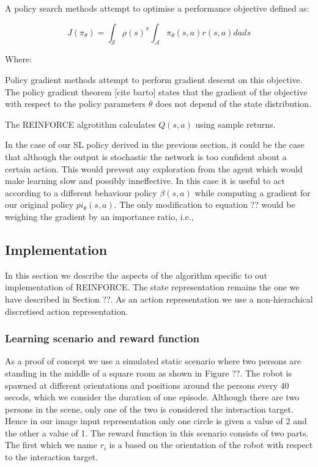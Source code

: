 \documentclass[a4paper,11pt]{report}
\begin{document}
A policy search methods attempt to optimise a performance objective defined as:

\begin{equation}
	J(\pi_{\theta}) = \int_{\mathcal{S}} \rho(s)^{\pi} \int_{\mathcal{A}}\pi_{\theta}(s,a)r(s,a)dads
\end{equation}

Where:

Policy gradient methods attempt to perform gradient descent on this objective. The policy gradient theorem [cite barto] states that the gradient of the objective with respect to the policy parameters $\theta$ does not depend of the state distribution.

The REINFORCE algrotithm calculates $Q(s,a)$ using sample returns.



In the case of our SL policy derived in the previous section, it could be the case that although the output is stochastic the network is too confident about a certain action. This would prevent any exploration from the agent which would make learning slow and possibly inneffective. In this case it is useful to act according to a different behaviour policy $\beta(s,a)$ while computing a gradient for our original policy $pi_{\theta}(s,a)$. The only modification to equation ?? would be weighing the gradient by an importance ratio, i.e.,  




\subsection{Implementation}
In this section we describe the aspects of the algorithm specific to out implementation of REINFORCE. The state representation remains the one we have described in Section ??. As an action representation we use a non-hierachical discretised action representation.

\subsubsection{Learning scenario and reward function}

As a proof of concept we use a simulated static scenario where two persons are standing in the middle of a square room as shown in Figure ??. The robot is spawned at different orientations and positions around the persons every 40 secods, which we consider the duration of one episode. Although there are two persons in the scene, only one of the two is considered the interaction target. Hence in our image input representation only one circle is given a value of 2 and the other a value of 1. The reward function in this scenario consists of two parts. The first which we name $r_i$ is a based on the orientation of the robot with respect to the interaction target. 
\end{document}
